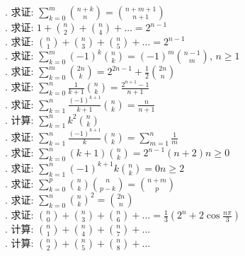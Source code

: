 \documentclass[10pt,twocolumn,letterpaper]{article}
\title{}
\author{}
\theoremstyle{mythmstyle}
\begin{document}
\large
{}. 求证: $\sum\limits_{k=0}^m \binom{n+k}{n}=\binom{n+m+1}{n+1}$\\

. 求证: $1+\binom{n}{2}+\binom{n}{4}+\dots=2^{n-1}$\\

. 求证: $\binom{n}{1}+\binom{n}{3}+\binom{n}{5}+\dots=2^{n-1}$\\

. 求证: $\sum\limits_{k=0}^m (-1)^{k}\binom{n}{k}=(-1)^{m}\binom{n-1}{m}$, \quad $n \geq 1$\\

. 求证: $\sum\limits_{k=0}^m\binom{2n}{k} = 2^{2n-1} + \frac{1}{2}\binom{2n}{n}$\\

. 求证: $\sum\limits_{k=0}^n \frac{1}{k+1}\binom{n}{k} = \frac{2^{n+1}-1}{n+1}$\\

. 求证: $\sum\limits_{k=1}^n \frac{(-1)^{k+1}}{k+1}\binom{n}{k} = \frac{n}{n+1}$\\

. 计算: $\sum\limits_{k=1}^n k^{2}\binom{n}{k}$\\

. 求证: $\sum\limits_{k=1}^n \frac{(-1)^{k+1}}{k}\binom{n}{k} = \sum\limits_{m=1}^n \frac{1}{m}$\\

. 求证: $\sum\limits_{k=0}^n {(k+1)}\binom{n}{k} = 2^{n-1}(n+2)$\quad $n \geq 0$\\

. 求证: $\sum\limits_{k=1}^n (-1)^{k+1}k\binom{n}{k} = 0$\quad $n \geq 2$\\

. 求证: $\sum\limits_{k=0}^p \binom{n}{k}\binom{n}{p-k} = \binom{n+m}{p}$\\

. 求证: $\sum\limits_{k=0}^n \binom{n}{k}^{2} = \binom{2n}{n}$\\

. 求证: $\binom{n}{0} + \binom{n}{3}+ \binom{n}{6}+ \dots = \frac{1}{3}(2^{n} + 2\cos{\frac{n\pi}{3}})$\\

. 计算: $\binom{n}{1} + \binom{n}{4}+ \binom{n}{7}+ \dots $\\

. 计算: $\binom{n}{2} + \binom{n}{5}+ \binom{n}{8}+ \dots $\\
\end{document}
